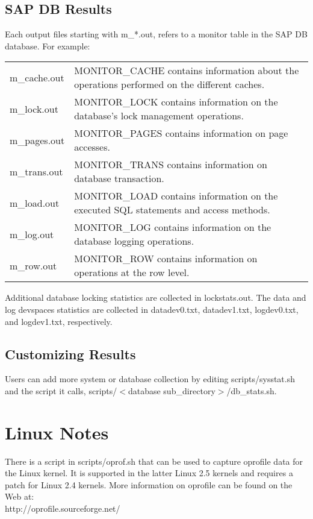 \documentclass{article}
\begin{document}
\subsection{SAP DB Results}

Each output files starting with m\_*.out, refers to a monitor table in the
SAP DB database.  For example:

\begin{tabular}[c]{ll}
m\_cache.out	&	MONITOR\_CACHE contains information about the operations
			performed on the different caches. \\
m\_lock.out	&	MONITOR\_LOCK contains information on the database's
			lock management operations. \\
m\_pages.out	&	MONITOR\_PAGES contains information on page accesses. \\
m\_trans.out	&	MONITOR\_TRANS contains information on database
			transaction. \\
m\_load.out	&	MONITOR\_LOAD contains information on the executed SQL
			statements and access methods. \\
m\_log.out	&	MONITOR\_LOG contains information on the database
			logging operations. \\
m\_row.out	&	MONITOR\_ROW contains information on operations at the
			row level. \\
\end{tabular}

\noindent
Additional database locking statistics are collected in lockstats.out.  The
data and log devspaces statistics are collected in datadev0.txt, datadev1.txt,
logdev0.txt, and logdev1.txt, respectively.

\subsection{Customizing Results}

Users can add more system or database collection by editing scripts/sysstat.sh
and the script it calls,  scripts/$<$database sub\_directory$>$/db\_stats.sh.

\section{Linux Notes}

There is a script in scripts/oprof.sh that can be used to capture oprofile
data for the Linux kernel.  It is supported in the latter Linux 2.5 kernels
and requires a patch for Linux 2.4 kernels.  More information on oprofile can
be found on the Web at: \\
\indent http://oprofile.sourceforge.net/
\end{document}
